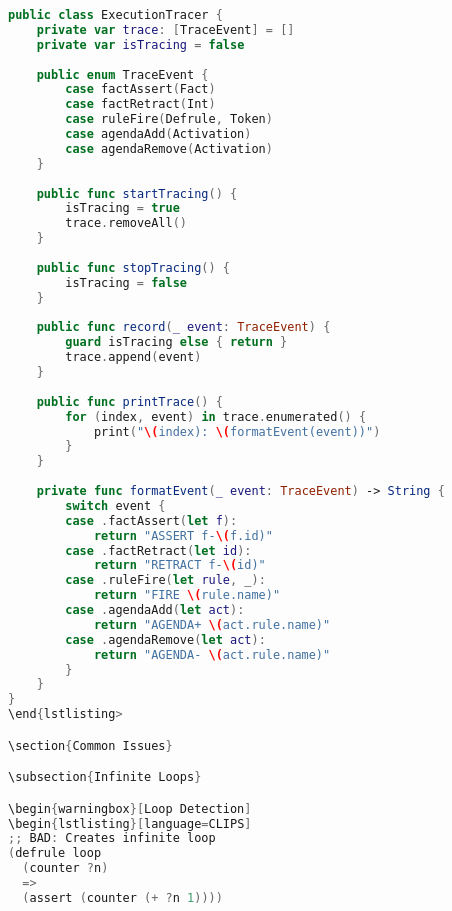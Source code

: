 \begin{lstlisting}[language=Swift]
public class ExecutionTracer {
    private var trace: [TraceEvent] = []
    private var isTracing = false
    
    public enum TraceEvent {
        case factAssert(Fact)
        case factRetract(Int)
        case ruleFire(Defrule, Token)
        case agendaAdd(Activation)
        case agendaRemove(Activation)
    }
    
    public func startTracing() {
        isTracing = true
        trace.removeAll()
    }
    
    public func stopTracing() {
        isTracing = false
    }
    
    public func record(_ event: TraceEvent) {
        guard isTracing else { return }
        trace.append(event)
    }
    
    public func printTrace() {
        for (index, event) in trace.enumerated() {
            print("\(index): \(formatEvent(event))")
        }
    }
    
    private func formatEvent(_ event: TraceEvent) -> String {
        switch event {
        case .factAssert(let f):
            return "ASSERT f-\(f.id)"
        case .factRetract(let id):
            return "RETRACT f-\(id)"
        case .ruleFire(let rule, _):
            return "FIRE \(rule.name)"
        case .agendaAdd(let act):
            return "AGENDA+ \(act.rule.name)"
        case .agendaRemove(let act):
            return "AGENDA- \(act.rule.name)"
        }
    }
}
\end{lstlisting>

\section{Common Issues}

\subsection{Infinite Loops}

\begin{warningbox}[Loop Detection]
\begin{lstlisting}[language=CLIPS]
;; BAD: Creates infinite loop
(defrule loop
  (counter ?n)
  =>
  (assert (counter (+ ?n 1))))
\end{lstlisting}

